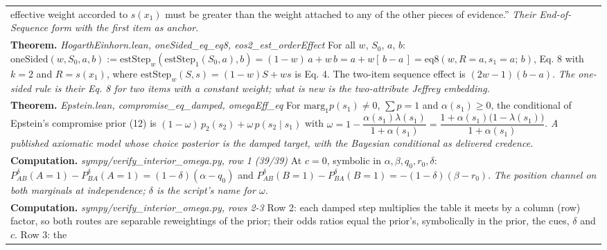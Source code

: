\documentclass[10pt]{article}
\theoremstyle{definition}
\newlength{\fullw}\setlength{\fullw}{25.9cm}
\begin{document}
{\begin{longtable}{|p{0.9cm}|p{12.2cm}|p{12.2cm}|}
{effective weight accorded to $s(x_1)$ must be greater than the weight attached to
any of the other pieces of evidence.'' \newline \textit{Their End-of-Sequence form with the first item as anchor.}} \\
\multicolumn{3}{|p{\fullw}|}{\textbf{Theorem.} \textit{HogarthEinhorn.lean, oneSided\_eq\_eq8, eos2\_est\_orderEffect} \newline For all $w$, $S_0$, $a$, $b$:
$\mathrm{oneSided}(w,S_0,a,b):=\mathrm{estStep}_w(\mathrm{estStep}_1(S_0,a),b)
 =(1-w)\,a+w\,b=a+w[\,b-a\,]=\mathrm{eq8}(w,R{=}a,s_1{=}a;\,b)$,
Eq. 8 with $k=2$ and $R=s(x_1)$, where $\mathrm{estStep}_w(S,s)=(1-w)S+ws$ is Eq. 4.
The two-item sequence effect is $(2w-1)(b-a)$. \newline \textit{The one-sided rule is their Eq. 8 for two items with a constant weight; what is new is the two-attribute Jeffrey embedding.}} \\
\multicolumn{3}{|p{\fullw}|}{\textbf{Theorem.} \textit{Epstein.lean, compromise\_eq\_damped, omegaEff\_eq} \newline For $\mathrm{marg}_1p(s_1)\neq0$, $\sum p=1$ and $\alpha(s_1)\ge0$, the
conditional of Epstein's compromise prior (12) is
$(1-\omega)\,p_2(s_2)+\omega\,p(s_2\mid s_1)$ with
$\omega=1-\dfrac{\alpha(s_1)\lambda(s_1)}{1+\alpha(s_1)}
 =\dfrac{1+\alpha(s_1)\bigl(1-\lambda(s_1)\bigr)}{1+\alpha(s_1)}$. \newline \textit{A published axiomatic model whose choice posterior is the damped target, with the Bayesian conditional as delivered credence.}} \\
\multicolumn{3}{|p{\fullw}|}{\textbf{Computation.} \textit{sympy/verify\_interior\_omega.py, row 1 (39/39)} \newline At $c=0$, symbolic in $\alpha,\beta,q_0,r_0,\delta$:
$P^{\delta}_{AB}(A{=}1)-P^{\delta}_{BA}(A{=}1)=(1-\delta)(\alpha-q_0)$ and
$P^{\delta}_{AB}(B{=}1)-P^{\delta}_{BA}(B{=}1)=-(1-\delta)(\beta-r_0)$. \newline \textit{The position channel on both marginals at independence; $\delta$ is the script's name for $\omega$.}} \\
\multicolumn{3}{|p{\fullw}|}{\textbf{Computation.} \textit{sympy/verify\_interior\_omega.py, rows 2-3} \newline Row 2: each damped step multiplies the table it meets by a column (row) factor,
so both routes are separable reweightings of the prior; their odds ratios equal the
prior's, symbolically in the prior, the cues, $\delta$ and $c$. Row 3: the
}
\end{longtable}}
\end{document}
